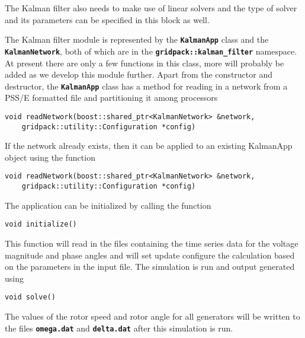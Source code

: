 The Kalman filter also needs to make use of linear solvers and the type of solver and its parameters can be specified in this block as well.

The Kalman filter module is represented by the \texttt{\textbf{KalmanApp}} class and the \texttt{\textbf{KalmanNetwork}}, both of which are in the \texttt{\textbf{gridpack::kalman\_filter}} namespace. At present there are only a few functions in this class, more will probably be added as we develop this module further. Apart from the constructor and destructor, the \texttt{\textbf{KalmanApp}} class has a method for reading in a network from a PSS/E formatted file and partitioning it among processors

{
\color{red}
\begin{Verbatim}[fontseries=b]
void readNetwork(boost::shared_ptr<KalmanNetwork> &network,
    gridpack::utility::Configuration *config)
\end{Verbatim}
}

If the network already exists, then it can be applied to an existing KalmanApp object using the function

{
\color{red}
\begin{Verbatim}[fontseries=b]
void readNetwork(boost::shared_ptr<KalmanNetwork> &network,
    gridpack::utility::Configuration *config)
\end{Verbatim}
}

The application can be initialized by calling the function

{
\color{red}
\begin{Verbatim}[fontseries=b]
void initialize()
\end{Verbatim}
}

This function will read in the files containing the time series data for the voltage magnitude and phase angles and will set update configure the calculation based on the parameters in the input file. The simulation is run and output generated using
{
\color{red}
\begin{Verbatim}[fontseries=b]
void solve()
\end{Verbatim}
}

The values of the rotor speed and rotor angle for all generators will be written to the files \texttt{\textbf{omega.dat}} and \texttt{\textbf{delta.dat}} after this simulation is run.

